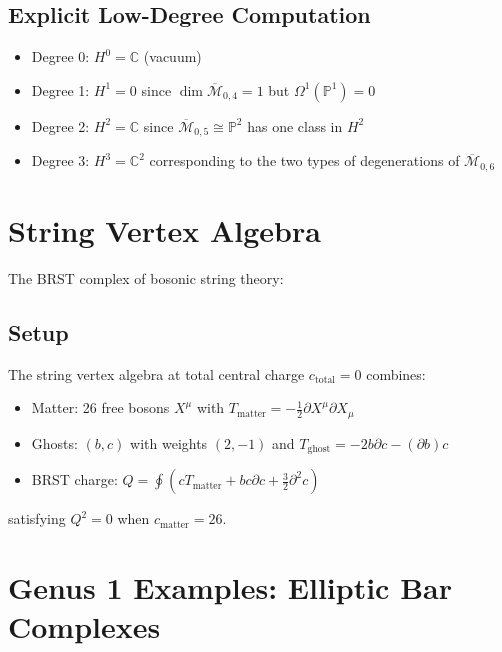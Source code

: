 \subsection{Explicit Low-Degree Computation}
 
\begin{example}
\begin{itemize}
\item Degree 0: $H^0 = \mathbb{C}$ (vacuum)
\item Degree 1: $H^1 = 0$ since $\dim \overline{\mathcal{M}}_{0,4} = 1$ but $\Omega^1(\mathbb{P}^1) = 0$
\item Degree 2: $H^2 = \mathbb{C}$ since $\overline{\mathcal{M}}_{0,5} \cong \mathbb{P}^2$ has one class in $H^2$
\item Degree 3: $H^3 = \mathbb{C}^2$ corresponding to the two types of degenerations of 
$\overline{\mathcal{M}}_{0,6}$
\end{itemize}
\end{example}
 
\section{String Vertex Algebra}
 
The BRST complex of bosonic string theory:
 
\subsection{Setup}
 
\begin{definition}
The string vertex algebra at total central charge $c_{\text{total}} = 0$ combines:
\begin{itemize}
\item Matter: 26 free bosons $X^\mu$ with $T_{\text{matter}} = -\frac{1}{2}\partial X^\mu \partial X_\mu$
\item Ghosts: $(b,c)$ with weights $(2,-1)$ and $T_{\text{ghost}} = -2b\partial c - (\partial b)c$
\item BRST charge: $Q = \oint \left(c T_{\text{matter}} + bc\partial c + \frac{3}{2}\partial^2 c\right)$
\end{itemize}
satisfying $Q^2 = 0$ when $c_{\text{matter}} = 26$.
\end{definition}

\section{Genus 1 Examples: Elliptic Bar Complexes}

